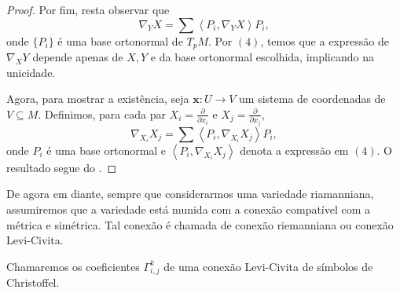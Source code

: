 \begin{theorem}
\begin{proof}
        Por fim, resta observar que
        \begin{equation*}
            \nabla_{Y}X = \sum \left<P_{i},\nabla_{Y}X\right> P_{i},
        \end{equation*}
        onde $\{ P_{i} \}$ é uma base ortonormal de $T_{p}M$. Por $(4)$, temos que a expressão de $\nabla_{X}Y$ depende apenas de $X, Y$ e da base ortonormal escolhida, implicando na unicidade.

        Agora, para mostrar a existência, seja $\mathbf{x}:U\to V$ um sistema de coordenadas de $V \subseteq M$. Definimos, para cada par $X_{i}=\frac{\partial}{\partial x_{i}}$ e $X_{j}=\frac{\partial}{\partial x_{j}}$,
        \begin{equation*}
            \nabla_{X_{i}}X_{j} = \sum \left<P_{i},\nabla_{X_{i}}X_{j}\right> P_{i},
        \end{equation*}
        onde $P_{i}$ é uma base ortonormal e $\left<P_{i},\nabla_{X_{i}}X_{j}\right>$ denota a expressão em $(4)$. O resultado segue do .
    \end{proof}
\end{theorem}
De agora em diante, sempre que considerarmos uma variedade riamanniana, assumiremos que a variedade está munida com a conexão compatível com a métrica e simétrica. Tal conexão é chamada de conexão riemanniana ou conexão Levi-Civita.

Chamaremos os coeficientes $\Gamma_{i,j}^{k}$ de uma conexão Levi-Civita de símbolos de Christoffel.

